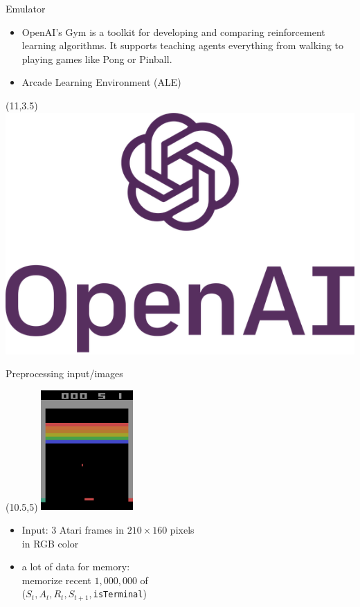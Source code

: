 \documentclass{beamer}
\begin{document}
\begin{frame}{Emulator}
\begin{itemize}
\item {OpenAI's Gym is a toolkit for developing and comparing reinforcement learning algorithms. It supports teaching agents everything from walking to playing games like Pong or Pinball.}
\pause
\item {Arcade Learning Environment (ALE)}
\end{itemize}
\begin{textblock}{20}(11,3.5)
\includegraphics[scale=0.1]{Images/openAI_logo.png}
\end{textblock}
\end{frame}
\begin{frame}{Preprocessing input/images}
	\begin{textblock}{20}(10.5,5)
	\includegraphics[width = 3.5cm]{Images/breakout_gym.png}
	\end{textblock}
	
	\begin{itemize}
	\item {Input: $3$ Atari frames in $210 \times 160$ pixels\\
	in RGB color}
	\pause
	\item {a lot of data for memory:\\
	memorize recent $1,000,000$ of\\
	($S_t,A_t,R_t,S_{t+1},$\texttt{isTerminal})
	}
	\end{itemize}
\end{frame}
\end{document}
